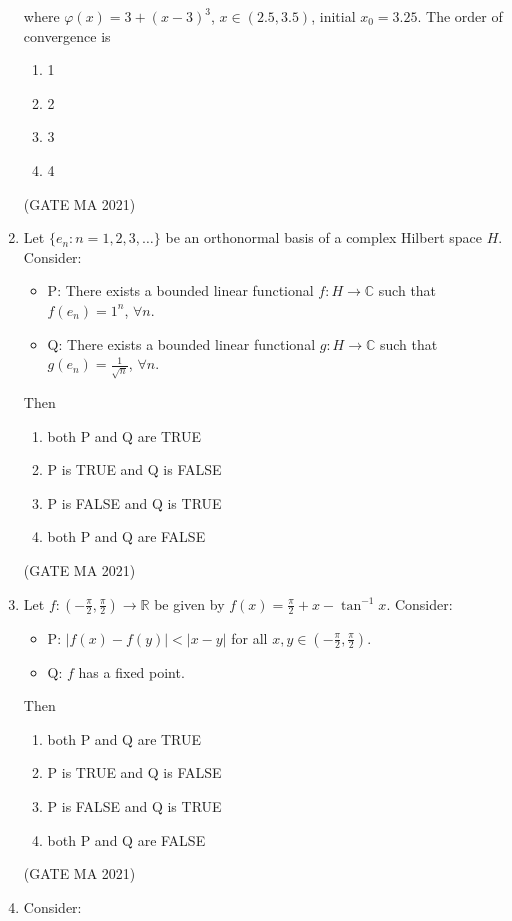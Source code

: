 \documentclass[journal,12pt,onecolumn]{IEEEtran}
\theoremstyle{remark}
\begin{document}
\begin{enumerate}
    where $\varphi(x) = 3 + (x-3)^3$, $x \in (2.5, 3.5)$, initial $x_0 = 3.25$.
    The order of convergence is
    \begin{enumerate}
        \item 1
        \item 2
        \item 3
        \item 4
    \end{enumerate}
    \hfill(GATE MA 2021)
    \item Let $\{e_n: n=1,2,3,\dots\}$ be an orthonormal basis of a complex Hilbert space $H$. Consider:
    \begin{itemize}
        \item P: There exists a bounded linear functional $f: H \to \mathbb{C}$ such that $f(e_n) = 1^n$, $\forall n$.
        \item Q: There exists a bounded linear functional $g: H \to \mathbb{C}$ such that $g(e_n) = \frac{1}{\sqrt{n}}$, $\forall n$.
    \end{itemize}
    Then
    \begin{enumerate}
        \item both P and Q are TRUE
        \item P is TRUE and Q is FALSE
        \item P is FALSE and Q is TRUE
        \item both P and Q are FALSE
    \end{enumerate}
    \hfill(GATE MA 2021)

    \item Let $f:(-\frac{\pi}{2}, \frac{\pi}{2}) \to \mathbb{R}$ be given by $f(x) = \frac{\pi}{2} + x - \tan^{-1}x$. Consider:
    \begin{itemize}
        \item P: $|f(x) - f(y)| < |x - y|$ for all $x,y \in (-\frac{\pi}{2}, \frac{\pi}{2})$.
        \item Q: $f$ has a fixed point.
    \end{itemize}
    Then
    \begin{enumerate}
        \item both P and Q are TRUE
        \item P is TRUE and Q is FALSE
        \item P is FALSE and Q is TRUE
        \item both P and Q are FALSE
    \end{enumerate}
    \hfill(GATE MA 2021)
    \item Consider:


\end{enumerate}
\end{document}
